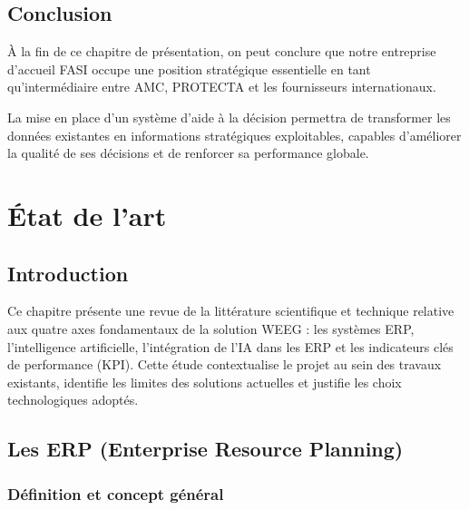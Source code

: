 \documentclass[a4paper,12pt]{report}
\begin{document}
\section{Conclusion}

À la fin de ce chapitre de présentation, on peut conclure que notre entreprise d'accueil FASI occupe une position stratégique essentielle en tant qu'intermédiaire entre AMC, PROTECTA et les fournisseurs internationaux.

La mise en place d'un système d'aide à la décision permettra de transformer les données existantes en informations stratégiques exploitables, capables d'améliorer la qualité de ses décisions et de renforcer sa performance globale.


\chapter{État de l'art}

\section{Introduction}

Ce chapitre présente une revue de la littérature scientifique et technique
relative aux quatre axes fondamentaux de la solution WEEG : les systèmes ERP,
l'intelligence artificielle, l'intégration de l'IA dans les ERP et les
indicateurs clés de performance (KPI). Cette étude contextualise le projet au
sein des travaux existants, identifie les limites des solutions actuelles et
justifie les choix technologiques adoptés.


\section{Les ERP (Enterprise Resource Planning)}

\subsection{Définition et concept général}
\end{document}
